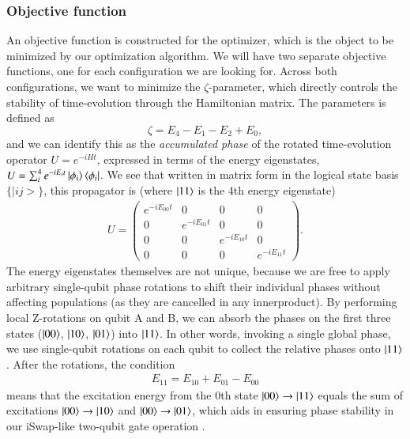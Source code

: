 \documentclass{subfiles}
\begin{document}
\subsubsection{Objective function}
An objective function is constructed for the optimizer, which is the object to be minimized by our optimization algorithm. We will have two separate objective functions, one for each configuration we are looking for. Across both configurations, we want to minimize the $\zeta$-parameter, which directly controls the stability of time-evolution through the Hamiltonian matrix. The parameters is defined as 
\begin{equation*}
    \zeta = E_4 - E_1 - E_2 + E_0,
\end{equation*}
and we can identify this as the \emph{accumulated phase} of the rotated time-evolution operator $U = e^{-iHt}$, expressed in terms of the energy eigenstates, $U = \sum_i^4 e^{-iE_it}\ket{\phi_i}\bra{\phi_i}$. We see that written in matrix form in the logical state basis $\{|ij>\}$, this propagator is (where $\ket{11}$ is the 4th energy eigenstate)
\begin{align*}
    U = \begin{pmatrix}
        e^{-iE_{00}t} & 0 & 0 & 0 \\
        0 & e^{-iE_{01}t} & 0 & 0 \\
        0 & 0 & e^{-iE_{10}t} & 0 \\
        0 & 0 & 0 & e^{-iE_{11}t}
    \end{pmatrix}.
\end{align*}
The energy eigenstates themselves are not unique, because we are free to apply arbitrary single-qubit phase rotations to shift their individual phases without affecting populations (as they are cancelled in any innerproduct). By performing local Z-rotations on qubit A and B, we can absorb the phases on the first three states ($\ket{00}$, $\ket{10}$, $\ket{01}$) into $\ket{11}$. In other words, invoking a single global phase, we use single-qubit rotations on each qubit to collect the relative phases onto $\ket{11}$. After the rotations, the condition
\begin{align*}
    E_{11} = E_{10} + E_{01} - E_00
\end{align*}
means that the excitation energy from the 0th state $\ket{00}\to\ket{11}$ equals the sum of excitations $\ket{00}\to\ket{10}$ and $\ket{00}\to\ket{01}$, which aids in ensuring phase stability in our iSwap-like two-qubit gate operation \cite{ku2020suppression}. 
\\\\
\end{document}
